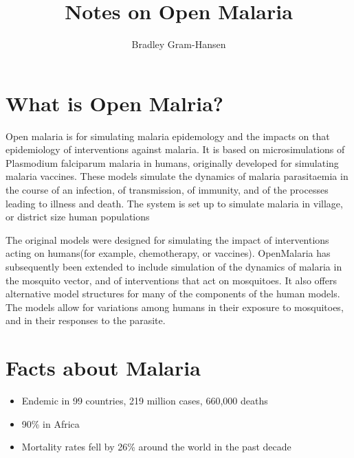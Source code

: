 \documentclass[]{scrartcl}
\title{Notes on Open Malaria}
\author{Bradley Gram-Hansen}
\begin{document}
\maketitle

\begin{abstract}

\end{abstract}

% 

\section{What is Open Malria?}
Open malaria is for simulating malaria epidemology and the impacts on that epidemiology of interventions against malaria. 
 It is based on microsimulations of Plasmodium falciparum malaria in humans, originally developed for simulating malaria vaccines.
 These models simulate the dynamics of malaria parasitaemia in the course of an infection, of transmission, of immunity, and of the processes leading to illness and death. The system is set up to simulate malaria in village, or district size human populations

The original models were designed for simulating the impact of interventions acting on humans(for example, chemotherapy, or vaccines). OpenMalaria has subsequently been extended to include simulation of the dynamics of malaria in the mosquito vector, and of interventions that act on mosquitoes. It also offers alternative model structures for many of the components of the human models. The models allow for variations among humans in their exposure to mosquitoes, and in their responses to the parasite.

\section{Facts about Malaria}

\begin{itemize}
\item Endemic in 99 countries, 219 million cases, 660,000 deaths 
\item 90\% in Africa
\item Mortality rates fell by 26\% around the world in the past decade
\end{itemize}
\end{document}

